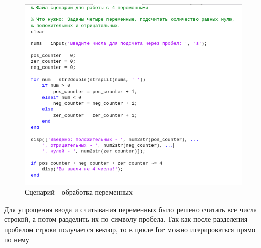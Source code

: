 \documentclass[12pt]{article}
\begin{document}
 \begin{figure}[!h]
	\centering
	\includegraphics[width=\linewidth]{file_procedure.png}
	\caption{Сценарий - обработка переменных}
\end{figure}
Для упрощения ввода и считывания переменных было решено считать все числа строкой, а потом разделить их по символу пробела. Так как после разделения пробелом строки получается вектор, то в цикле \textbf{for} можно итерироваться прямо по нему
\end{document}
